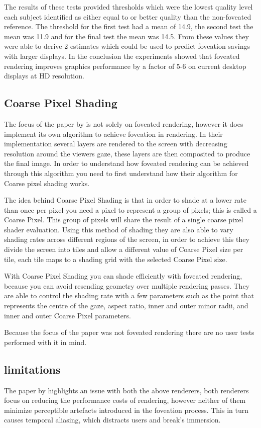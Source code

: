 The results of these tests provided thresholds which were the lowest quality level each subject identified as either equal to or better quality than the non-foveated reference. The threshold for the first test had a mean of 14.9, the second test the mean was 11.9 and for the final test the mean was 14.5. From these values they were able to derive 2 estimates which could be used to predict foveation savings with larger displays. In the conclusion the experiments showed that foveated rendering improves graphics performance by a factor of 5-6 on current desktop displays at HD resolution.

\subsection{Coarse Pixel Shading}
The focus of the paper by \cite{Vaidyanathan:2014:CPS:2980009.2980011} is not solely on foveated rendering, however it does implement its own algorithm to achieve foveation in rendering. In their implementation several layers are rendered to the screen with decreasing resolution around the viewers gaze, these layers are then composited to produce the final image. In order to understand how foveated rendering can be achieved through this algorithm you need to first understand how their algorithm for Coarse pixel shading works.

The idea behind Coarse Pixel Shading is that in order to shade at a lower rate than once per pixel you need a pixel to represent a group of pixels; this is called a Coarse Pixel. This group of pixels will share the result of a single coarse pixel shader evaluation. Using this method of shading they are also able to vary shading rates across different regions of the screen, in order to achieve this they divide the screen into tiles and allow a different value of Coarse Pixel size per tile, each tile maps to a shading grid with the selected Coarse Pixel size.

With Coarse Pixel Shading you can shade efficiently with foveated rendering, because you can avoid resending geometry over multiple rendering passes. They are able to control the shading rate with a few parameters such as the point that represents the centre of the gaze, aspect ratio, inner and outer minor radii, and inner and outer Coarse Pixel parameters.

Because the focus of the paper was not foveated rendering there are no user tests performed with it in mind.

\subsection{limitations}
The paper by \cite{Patney} highlights an issue with both the above renderers, both renderers focus on reducing the performance costs of rendering, however neither of them minimize perceptible artefacts introduced in the foveation process. This in turn causes temporal aliasing, which distracts users and break's immersion.
